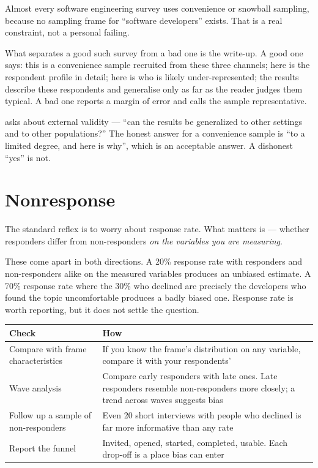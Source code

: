 \begin{conceptbox}
Almost every software engineering survey uses convenience or snowball sampling,
because no sampling frame for ``software developers'' exists. That is a real
constraint, not a personal failing.

\medskip
What separates a good such survey from a bad one is the write-up. A good one
says: this is a convenience sample recruited from these three channels; here is
the respondent profile in detail; here is who is likely under-represented; the
results describe these respondents and generalise only as far as the reader
judges them typical. A bad one reports a margin of error and calls the sample
representative.

\medskip
{} asks about external validity --- ``can the
results be generalized to other settings and to other populations?'' The honest
answer for a convenience sample is ``to a limited degree, and here is why'',
which is an acceptable answer. A dishonest ``yes'' is not.
\end{conceptbox}

\section{Nonresponse}

\begin{alertbox}
The standard reflex is to worry about response rate. What matters is
 --- whether responders differ from non-responders
\emph{on the variables you are measuring}.

\medskip
These come apart in both directions. A 20\% response rate with responders and
non-responders alike on the measured variables produces an unbiased estimate. A
70\% response rate where the 30\% who declined are precisely the developers
who found the topic uncomfortable produces a badly biased one. Response rate is
worth reporting, but it does not settle the question.
\end{alertbox}

\begin{center}
\small
\begin{tabular}{@{}L{4.2cm}L{10.1cm}@{}}
\toprule
\textbf{Check} & \textbf{How} \\
\midrule
Compare with frame characteristics
  & If you know the frame's distribution on any variable, compare it with your
    respondents' \\
Wave analysis
  & Compare early responders with late ones. Late responders resemble
    non-responders more closely; a trend across waves suggests bias \\
Follow up a sample of non-responders
  & Even 20 short interviews with people who declined is far more informative
    than any rate \\
Report the funnel
  & Invited, opened, started, completed, usable. Each drop-off is a place bias
    can enter \\
\bottomrule
\end{tabular}
\end{center}

